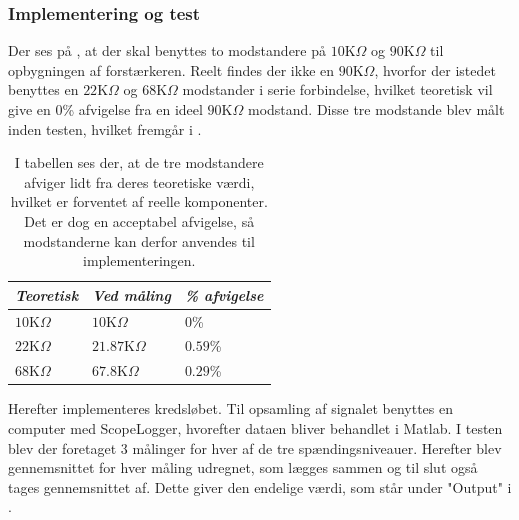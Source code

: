 \subsubsection{Implementering og test}
Der ses på , at der skal benyttes to modstandere på $10$K$\Omega$ og $90$K$\Omega$ til opbygningen af forstærkeren. Reelt findes der ikke en $90$K$\Omega$, hvorfor der istedet benyttes en $22$K$\Omega$ og $68$K$\Omega$ modstander i serie forbindelse, hvilket teoretisk vil give en $0$\% afvigelse fra en ideel $90$K$\Omega$ modstand. Disse tre modstande blev målt inden testen, hvilket fremgår i .
\begin{table}[H]
	\centering
	\begin{tabular}{|l|l|l|}
		\hline
		\textit{Teoretisk} & \textit{Ved måling} & \textit{\% afvigelse} \\ \hline
		$10$K$\Omega$       & $10$K$\Omega$        & $0$\%               \\ \hline
		$22$K$\Omega$      & $21.87$K$\Omega$     & $0.59$\%               \\ \hline
		$68$K$\Omega$      & $67.8$K$\Omega$       & $0.29$\%               \\ \hline
	\end{tabular}
	\caption{I tabellen ses der, at de tre modstandere afviger lidt fra deres teoretiske værdi, hvilket er forventet af reelle komponenter. Det er dog en acceptabel afvigelse, så modstanderne kan derfor anvendes til implementeringen.}
	\label{Tab:modstand_faktor18}
\end{table}

\noindent Herefter implementeres kredsløbet. Til opsamling af signalet benyttes en computer med ScopeLogger, hvorefter dataen bliver behandlet i Matlab. I testen blev der foretaget 3 målinger for hver af de tre spændingsniveauer. Herefter blev gennemsnittet for hver måling udregnet, som lægges sammen og til slut også tages gennemsnittet af. Dette giver den endelige værdi, som står under "Output" i .\


